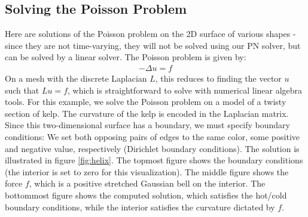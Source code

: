 \subsection*{Solving the Poisson Problem}
Here are solutions of the Poisson problem on the 2D surface of various shapes - since they are not time-varying, they will not be solved using our PN solver, but can be solved by a linear solver. The Poisson problem is given by:
\begin{align}
    -\Delta u = f
\end{align}
On a mesh with the discrete Laplacian $L$, this reduces to finding the vector $u$ such that $Lu = f$, which is straightforward to solve with numerical linear algebra tools. For this example, we solve the Poisson problem on a model of a twisty section of kelp. The curvature of the kelp is encoded in the Laplacian matrix. Since this two-dimensional surface has a boundary, we must specify boundary conditions: We set both opposing pairs of edges to the same color, some positive and negative value, respectively (Dirichlet boundary conditions). The solution is illustrated in figure \ref{fig:helix}. The topmost figure shows the boundary conditions (the interior is set to zero for this visualization). The middle figure shows the force $f$, which is a positive stretched Gaussian bell on the interior. The bottommost figure shows the computed solution, which satisfies the hot/cold boundary conditions, while the interior satisfies the curvature dictated by $f$.
\newpage

